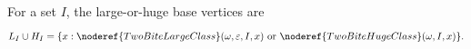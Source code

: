 \begin{definition}
For a set \(I\), the large-or-huge base vertices are
\[
L_I\cup H_I
=\{x:\noderef{TwoBiteLargeClass}(\omega,\varepsilon,I,x)
\text{ or }\noderef{TwoBiteHugeClass}(\omega,I,x)\}.
\]
\end{definition}
